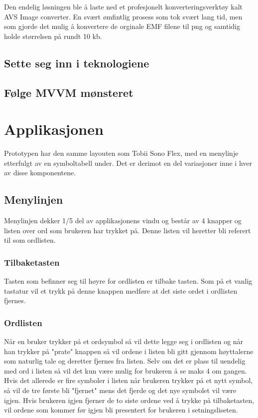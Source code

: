 { 
Den endelig løsningen ble å laste ned et profesjonelt konverteringsverktøy kalt AVS Image converter. En svært ømfintlig prosess som tok svært lang tid, men som gjorde det mulig å konvertere de orginale EMF filene til png og samtidig holde størrelsen på rundt 10 kb. 


\subsection{Sette seg inn i teknologiene}

\subsection{Følge MVVM mønsteret}
 
 
\section{Applikasjonen} 

Prototypen har den samme layouten som Tobii Sono Flex, med en menylinje etterfulgt av en symboltabell under. Det er derimot en del variasjoner inne i hver av disse komponentene. 
 
 
\subsection{Menylinjen} 
 
Menylinjen dekker 1/5 del av applikasjonens vindu og består av 4 knapper og listen over ord som brukeren har trykket på. Denne listen vil heretter bli referert til som ordlisten. 
 
 
\subsubsection{Tilbaketasten} 
 
Tasten som befinner seg til høyre for ordlisten er tilbake tasten. Som på et vanlig tastatur vil et trykk på denne knappen medføre at det siste ordet i ordlisten fjernes. 
 
 
\subsubsection{Ordlisten} 
 
Når en bruker trykker på et ordsymbol så vil dette legge seg i ordlisten og når han trykker på "prate" knappen så vil ordene i listen bli gitt gjennom høyttalerne som naturlig tale og deretter fjernes fra listen. Selv om det er plass til uendelig med ord i listen så vil det kun være mulig for brukeren å se maks 4 om gangen. Hvis det allerede er fire symboler i listen når brukeren trykker på et nytt symbol, så vil de tre første bli "fjernet" mens det fjerde og det nye symbolet vil være igjen. Hvis brukeren igjen fjerner de to siste ordene ved å trykke på tilbaketasten,  vil ordene som kommer før igjen bli presentert for brukeren i setningsliseten.  
 
}
